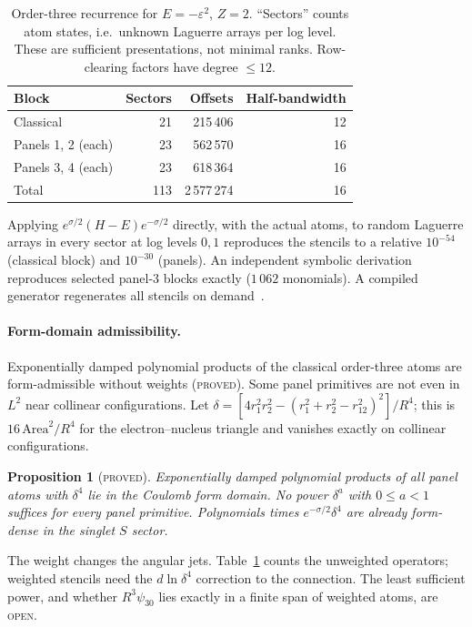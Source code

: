 \documentclass[aps,pra,twocolumn,superscriptaddress,nofootinbib]{revtex4-2}
\newtheorem{proposition}[theorem]{Proposition}
\theoremstyle{remark}
\newcommand{\lab}[1]{\textup{\textsc{#1}}}
\begin{document}
\begin{table}[t]
\caption{Order-three recurrence for $E=-\varepsilon^2$, $Z=2$.
``Sectors'' counts atom states, i.e.\ unknown Laguerre arrays per log level.
These are sufficient presentations, not minimal ranks.
Row-clearing factors have degree $\le12$.}
\label{tab:counts}
\begin{ruledtabular}
\begin{tabular}{lrrr}
Block & Sectors & Offsets & Half-bandwidth\\
\hline
Classical & 21 & 215\,406 & 12\\
Panels 1, 2 (each) & 23 & 562\,570 & 16\\
Panels 3, 4 (each) & 23 & 618\,364 & 16\\
\hline
Total & 113 & 2\,577\,274 & 16
\end{tabular}
\end{ruledtabular}
\end{table}

Applying $e^{\sigma/2}(H-E)e^{-\sigma/2}$ directly, with the actual atoms, to random Laguerre arrays in every sector at log levels $0,1$ reproduces the stencils to a relative $10^{-54}$ (classical block) and $10^{-30}$ (panels).
An independent symbolic derivation reproduces selected panel-3 blocks exactly ($1\,062$ monomials).
A compiled generator regenerates all stencils on demand~\cite{record}.

\paragraph*{Form-domain admissibility.}
Exponentially damped polynomial products of the classical order-three atoms are form-admissible without weights (\lab{proved}).
Some panel primitives are not even in $L^2$ near collinear configurations.
Let $\delta=[4r_1^2r_2^2-(r_1^2+r_2^2-r_{12}^2)^2]/R^4$; this is $16\,\mathrm{Area}^2/R^4$ for the electron--nucleus triangle and vanishes exactly on collinear configurations.
\begin{proposition}[\lab{proved}]\label{prop:weight}
Exponentially damped polynomial products of all panel atoms with $\delta^4$ lie in the Coulomb form domain.
No power $\delta^a$ with $0\le a<1$ suffices for every panel primitive.
Polynomials times $e^{-\sigma/2}\delta^4$ are already form-dense in the singlet $S$ sector.
\end{proposition}
\noindent
The weight changes the angular jets.
Table~\ref{tab:counts} counts the unweighted operators; weighted stencils need the $d\ln\delta^4$ correction to the connection.
The least sufficient power, and whether $R^3\psi_{30}$ lies exactly in a finite span of weighted atoms, are \lab{open}.
\end{document}
